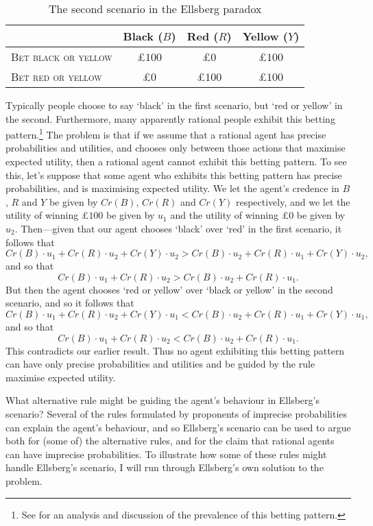 \begin{table}[ht]
  \centering
    \begin{tabular}{lccc}
      \hline
                                   & Black ($B$) & Red ($R$) & Yellow ($Y$) \\\hline\hline
      \textsc{Bet black or yellow} & £$100$ & £$0$ & £$100$\\
      \textsc{Bet red or yellow}   & £$0$ & £$100$ & £$100$\\ 
      \hline
    \end{tabular}
  \caption{The second scenario in the Ellsberg paradox}
  \label{mahtani:table3}
  \end{table}

Typically people choose to say `black' in the first scenario, but `red or yellow' in the second. Furthermore, many apparently rational people exhibit this betting pattern.\footnote{See \citet{Voorhoeve2016} for an analysis and discussion of the prevalence of this betting pattern.} The problem is that if we assume that a rational agent has precise probabilities and utilities, and chooses only between those actions that maximise expected utility, then a rational agent cannot exhibit this betting pattern. To see this, let's suppose that some agent who exhibits this betting pattern has precise probabilities, and is maximising expected utility. We let the agent's credence in $B$, $R$ and $Y$ be given by $Cr(B)$, $Cr(R)$ and $Cr(Y)$ respectively, and we let the utility of winning £$100$ be given by $u_1$ and the utility of winning £$0$ be given by $u_2$. Then---given that our agent chooses `black' over `red' in the first scenario, it follows that
$$Cr(B) \cdot u_1 + Cr(R) \cdot u_2 + Cr(Y)\cdot u_2 > Cr(B) \cdot u_2 + Cr(R) \cdot u_1 + Cr(Y) \cdot u_2,$$ and so that
$$Cr(B) \cdot u_1 + Cr(R) \cdot u_2 > Cr(B) \cdot u_2 + Cr(R) \cdot u_1.$$
But then the agent chooses `red or yellow' over `black or yellow' in the second scenario, and so it follows that
$$ Cr(B) \cdot u_1 + Cr(R) \cdot u_2 + Cr(Y) \cdot u_1 < Cr(B) \cdot u_2 + Cr(R) \cdot u_1 + Cr(Y) \cdot u_1,$$
and so that
$$ Cr(B) \cdot u_1 + Cr(R) \cdot u_2 < Cr(B) \cdot u_2 + Cr(R) \cdot u_1.$$
This contradicts our earlier result. Thus no agent exhibiting this betting pattern can have only precise probabilities and utilities and be guided by the rule maximise expected utility. 

What alternative rule might be guiding the agent's behaviour in Ellsberg's scenario? Several of the rules formulated by proponents of imprecise probabilities can explain the agent's behaviour, and so Ellsberg's scenario can be used to argue both for (some of) the alternative rules, and for the claim that rational agents can have imprecise probabilities. To illustrate how some of these rules might handle Ellsberg's scenario, I will run through Ellsberg's own solution to the problem. 

